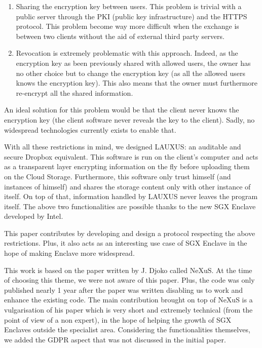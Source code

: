 \documentclass[../main.tex]{subfiles}
\begin{document}
\begin{enumerate}
    \item Sharing the encryption key between users. This problem is trivial with a public server through the PKI (public key infrastructure) and the HTTPS protocol. This problem become way more difficult when the exchange is between two clients without the aid of external third party servers.
    \item Revocation is extremely problematic with this approach. Indeed, as the encryption key as been previously shared with allowed users, the owner has no other choice but to change the encryption key (as all the allowed users knows the encryption key). This also means that the owner must furthermore re-encrypt all the shared information.
\end{enumerate}
\par An ideal solution for this problem would be that the client never knows the encryption key (the client software never reveals the key to the client). Sadly, no widespread technologies currently exists to enable that.\\

\par With all these restrictions in mind, we designed LAUXUS: an auditable and secure Dropbox equivalent. This software is run on the client's computer and acts as a transparent layer encrypting information on the fly before uploading them on the Cloud Storage. Furthermore, this software only trust himself (and instances of himself) and shares the storage content only with other instance of itself. On top of that, information handled by LAUXUS never leaves the program itself. The above two functionalities are possible thanks to the new SGX Enclave developed by Intel.
\par This paper contributes by developing and design a protocol respecting the above restrictions. Plus, it also acts as an interesting use case of SGX Enclave in the hope of making Enclave more widespread.
\par This work is based on the paper written by J. Djoko called NeXuS\cite{djoko2019nexus}. At the time of choosing this theme, we were not aware of this paper. Plus, the code was only published nearly 1 year after the paper was written disabling us to work and enhance the existing code. The main contribution brought on top of NeXuS is a vulgarisation of his paper which is very short and extremely technical (from the point of view of a non expert), in the hope of helping the growth of SGX Enclaves outside the specialist area. Considering the functionalities themselves, we added the GDPR aspect that was not discussed in the initial paper.
\end{document}
